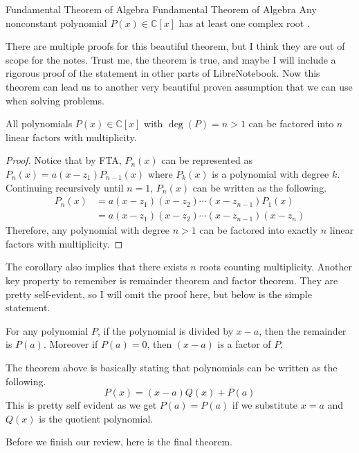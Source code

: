 \documentclass[../../main.tex]{subfiles}
\begin{document}
\begin{theorem}
{Fundamental Theorem of Algebra}
{Fundamental Theorem of Algebra}
Any nonconstant polynomial $P(x) \in \mathbb{C}[x]$ has at least one
complex root \cite{MATH01-3}.
\end{theorem}

There are multiple proofs for this beautiful theorem, but I think
they are out of scope for the notes. Trust me, the theorem is true,
and maybe I will include a rigorous proof of the statement in other
parts of LibreNotebook. Now this theorem can lead us to another very
beautiful proven assumption that we can use when solving problems.

\begin{corollary}{}{}
All polynomials $P(x) \in \mathbb{C}[x]$ with $\deg(P) = n > 1$
can be factored into $n$ linear factors with multiplicity.
\end{corollary}
\begin{proof}
Notice that by FTA, $P_n(x)$ can be represented as $P_n(x) =
a (x - z_1) P_{n-1}(x)$ where $P_k(x)$ is a polynomial with degree
$k$. Continuing recursively until $n = 1$, $P_n(x)$ can be written as
the following.
\begin{align*}
    P_n(x)
    &= a (x - z_1) (x - z_2) \cdots (x - z_{n-1}) P_1 (x) \\
    &= a (x - z_1) (x - z_2) \cdots (x - z_{n-1}) (x - z_n)
\end{align*}
Therefore, any polynomial with degree $n > 1$ can be factored into
exactly $n$ linear factors with multiplicity.
\end{proof}

The corollary also implies that there exists $n$ roots counting
multiplicity. Another key property to remember is remainder
theorem and factor theorem. They are pretty self-evident, so I
will omit the proof here, but below is the simple statement.

\begin{theorem}{}{}
For any polynomial $P$, if the polynomial is divided by $x - a$,
then the remainder is $P(a)$. Moreover if $P(a) = 0$, then $(x - a)$
is a factor of $P$.
\end{theorem}

The theorem above is basically stating that polynomials can be written
as the following.
\[
P(x) = (x - a) Q(x) + P(a)
\]
This is pretty self evident as we get $P(a) = P(a)$ if we substitute
$x = a$ and $Q(x)$ is the quotient polynomial.

Before we finish our review, here is the final theorem.
\end{document}
